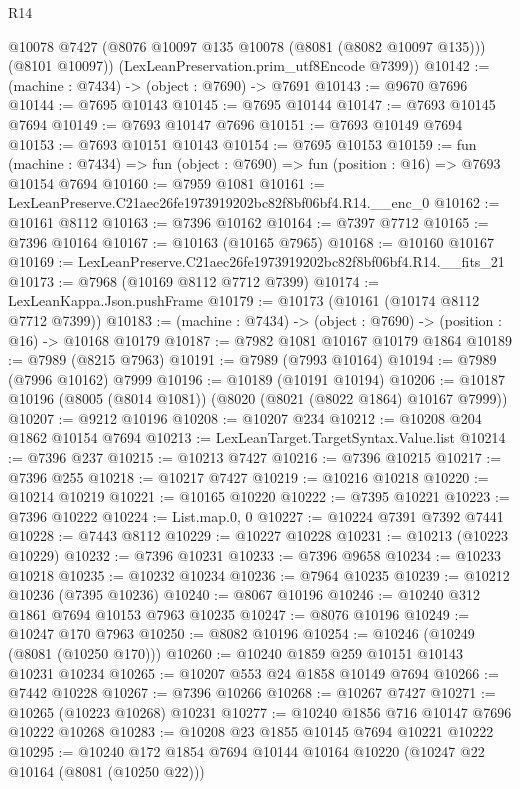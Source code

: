 \begin{lexlean}{R14}
\begin{coremodule}
        @10078
        @7427
        (@8076 @10097 @135 @10078 (@8081 (@8082 @10097 @135)))
        (@8101 @10097))
      (LexLeanPreservation.prim_utf8Encode @7399))
@10142 := (machine : @7434) -> (object : @7690) -> @7691
@10143 := @9670 @7696
@10144 := @7695 @10143
@10145 := @7695 @10144
@10147 := @7693 @10145 @7694
@10149 := @7693 @10147 @7696
@10151 := @7693 @10149 @7694
@10153 := @7693 @10151 @10143
@10154 := @7695 @10153
@10159 := fun (machine : @7434) =>
  fun (object : @7690) => fun (position : @16) => @7693 @10154 @7694
@10160 := @7959 @1081
@10161 := LexLeanPreserve.C21aec26fe1973919202bc82f8bf06bf4.R14.__enc_0
@10162 := @10161 @8112
@10163 := @7396 @10162
@10164 := @7397 @7712
@10165 := @7396 @10164
@10167 := @10163 (@10165 @7965)
@10168 := @10160 @10167
@10169 := LexLeanPreserve.C21aec26fe1973919202bc82f8bf06bf4.R14.__fits_21
@10173 := @7968 (@10169 @8112 @7712 @7399)
@10174 := LexLeanKappa.Json.pushFrame
@10179 := @10173 (@10161 (@10174 @8112 @7712 @7399))
@10183 := (machine : @7434) -> (object : @7690) -> (position : @16) -> @10168 @10179
@10187 := @7982 @1081 @10167 @10179 @1864
@10189 := @7989 (@8215 @7963)
@10191 := @7989 (@7993 @10164)
@10194 := @7989 (@7996 @10162) @7999
@10196 := @10189 (@10191 @10194)
@10206 := @10187 @10196 (@8005 (@8014 @1081)) (@8020 (@8021 (@8022 @1864) @10167 @7999))
@10207 := @9212 @10196
@10208 := @10207 @234
@10212 := @10208 @204 @1862 @10154 @7694
@10213 := LexLeanTarget.TargetSyntax.Value.list
@10214 := @7396 @237
@10215 := @10213 @7427
@10216 := @7396 @10215
@10217 := @7396 @255
@10218 := @10217 @7427
@10219 := @10216 @10218
@10220 := @10214 @10219
@10221 := @10165 @10220
@10222 := @7395 @10221
@10223 := @7396 @10222
@10224 := List.map.{0, 0}
@10227 := @10224 @7391 @7392 @7441
@10228 := @7443 @8112
@10229 := @10227 @10228
@10231 := @10213 (@10223 @10229)
@10232 := @7396 @10231
@10233 := @7396 @9658
@10234 := @10233 @10218
@10235 := @10232 @10234
@10236 := @7964 @10235
@10239 := @10212 @10236 (@7395 @10236)
@10240 := @8067 @10196
@10246 := @10240 @312 @1861 @7694 @10153 @7963 @10235
@10247 := @8076 @10196
@10249 := @10247 @170 @7963
@10250 := @8082 @10196
@10254 := @10246 (@10249 (@8081 (@10250 @170)))
@10260 := @10240 @1859 @259 @10151 @10143 @10231 @10234
@10265 := @10207 @553 @24 @1858 @10149 @7694
@10266 := @7442 @10228
@10267 := @7396 @10266
@10268 := @10267 @7427
@10271 := @10265 (@10223 @10268) @10231
@10277 := @10240 @1856 @716 @10147 @7696 @10222 @10268
@10283 := @10208 @23 @1855 @10145 @7694 @10221 @10222
@10295 := @10240 @172 @1854 @7694 @10144 @10164 @10220 (@10247 @22 @10164 (@8081 (@10250 @22)))

\end{coremodule}
\end{lexlean}
